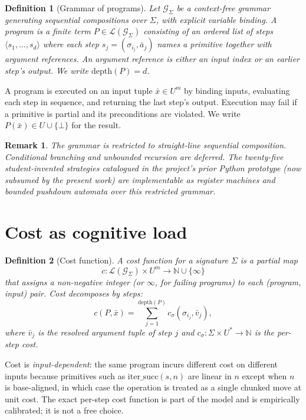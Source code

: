 \documentclass[11pt]{article}
\newtheorem{definition}{Definition}
\newtheorem{remark}{Remark}
\begin{document}
\begin{definition}[Grammar of programs]
Let $\mathcal{G}_\Sigma$ be a context-free grammar generating
sequential compositions over $\Sigma$, with explicit variable binding.
A \emph{program} is a finite term $P \in \mathcal{L}(\mathcal{G}_\Sigma)$
consisting of an ordered list of steps $\langle s_1, \dots, s_d \rangle$
where each step $s_j = (\sigma_{i_j}, \bar{a}_j)$ names a primitive
together with argument references. An argument reference is either an
input index or an earlier step's output. We write
$\mathrm{depth}(P) = d$.
\end{definition}

A program is executed on an input tuple $\bar{x} \in U^m$ by binding
inputs, evaluating each step in sequence, and returning the last
step's output. Execution may fail if a primitive is partial and its
preconditions are violated. We write $P(\bar{x}) \in U \cup \{\bot\}$
for the result.

\begin{remark}
The grammar is restricted to straight-line sequential composition.
Conditional branching and unbounded recursion are deferred. The
twenty-five student-invented strategies catalogued in the project's
prior Python prototype (now subsumed by the present work) are
implementable as register machines and bounded pushdown automata over
this restricted grammar.
\end{remark}

\section{Cost as cognitive load}

\begin{definition}[Cost function]
A \emph{cost function} for a signature $\Sigma$ is a partial map
\[
c : \mathcal{L}(\mathcal{G}_\Sigma) \times U^m \to \mathbb{N} \cup \{\infty\}
\]
that assigns a non-negative integer (or $\infty$, for failing programs)
to each (program, input) pair. Cost decomposes by steps:
\[
c(P, \bar{x}) = \sum_{j=1}^{\mathrm{depth}(P)} c_\sigma(\sigma_{i_j},
\bar{v}_j),
\]
where $\bar{v}_j$ is the resolved argument tuple of step $j$ and
$c_\sigma:\Sigma \times U^* \to \mathbb{N}$ is the per-step cost.
\end{definition}

Cost is \emph{input-dependent}: the same program incurs different cost
on different inputs because primitives such as $\mathrm{iter\_succ}(s,n)$
are linear in $n$ except when $n$ is base-aligned, in which case the
operation is treated as a single chunked move at unit cost. The exact
per-step cost function is part of the model and is empirically
calibrated; it is not a free choice.
\end{document}
